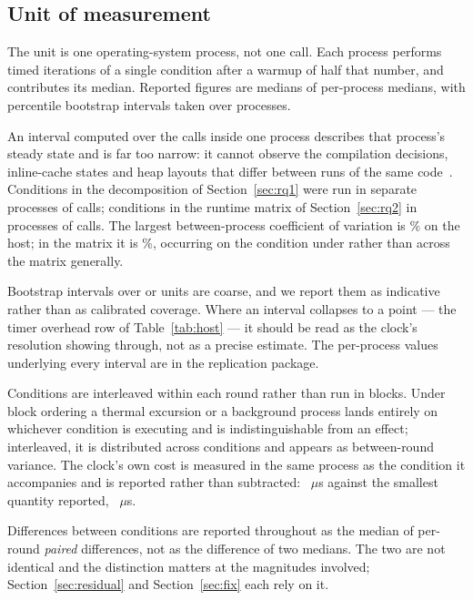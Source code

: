 \documentclass[pdflatex,sn-basic,twocolumn]{sn-jnl}%
\begin{document}
\subsection{Unit of measurement}\label{sec:unit}

The unit is one operating-system process, not one call. Each process performs
\HostCallsPerInvocation{} timed iterations of a single condition after a warmup
of half that number, and contributes its median. Reported figures are medians of
per-process medians, with percentile bootstrap intervals taken over processes.

An interval computed over the calls inside one process describes that process's
steady state and is far too narrow: it cannot observe the compilation decisions,
inline-cache states and heap layouts that differ between runs of the same
code~\cite{georges2007statistically}. Conditions in the decomposition of
Section~\ref{sec:rq1} were run in \HostInvocations{} separate processes of
\HostCallsPerInvocation{} calls; conditions in the runtime matrix of
Section~\ref{sec:rq2} in \MatrixInvocations{} processes of
\MatrixCallsPerInvocation{} calls. The largest between-process coefficient of
variation is \HostCvMax\% on the host; in the matrix it is \MatrixCvMax\%,
occurring on the \MatrixCvMaxCondition{} condition under
\MatrixCvMaxEnvironment{} rather than across the matrix generally.

Bootstrap intervals over \HostInvocations{} or \MatrixInvocations{} units are
coarse, and we report them as indicative rather than as calibrated coverage.
Where an interval collapses to a point --- the timer overhead row of
Table~\ref{tab:host} --- it should be read as the clock's resolution showing
through, not as a precise estimate. The per-process values underlying every
interval are in the replication package.

Conditions are interleaved within each round rather than run in blocks. Under
block ordering a thermal excursion or a background process lands entirely on
whichever condition is executing and is indistinguishable from an effect;
interleaved, it is distributed across conditions and appears as between-round
variance. The clock's own cost is measured in the same process as the condition
it accompanies and is reported rather than subtracted: \HostTimerOverhead~$\mu$s
against the smallest quantity reported, \HostCreateSecretKey~$\mu$s.

Differences between conditions are reported throughout as the median of
per-round \emph{paired} differences, not as the difference of two medians. The
two are not identical and the distinction matters at the magnitudes involved;
Section~\ref{sec:residual} and Section~\ref{sec:fix} each rely on it.
\end{document}
